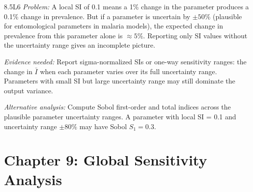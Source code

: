 \begin{solution}{8.5}{L6}
\textit{Problem:} A local SI of 0.1 means a 1\% change in the parameter
produces a 0.1\% change in prevalence. But if a parameter is uncertain
by $\pm50\%$ (plausible for entomological parameters in malaria models),
the expected change in prevalence from this parameter alone is $\approx 5\%$.
Reporting only SI values without the uncertainty range gives an incomplete
picture.

\textit{Evidence needed:} Report sigma-normalized SIs or one-way sensitivity
ranges: the change in $\bar{I}$ when each parameter varies over its full
uncertainty range. Parameters with small SI but large uncertainty range
may still dominate the output variance.

\textit{Alternative analysis:} Compute Sobol first-order and total indices
across the plausible parameter uncertainty ranges. A parameter with local
SI = 0.1 and uncertainty range $\pm80\%$ may have Sobol $S_1 = 0.3$.


\end{solution}


\section{Chapter 9: Global Sensitivity Analysis}

